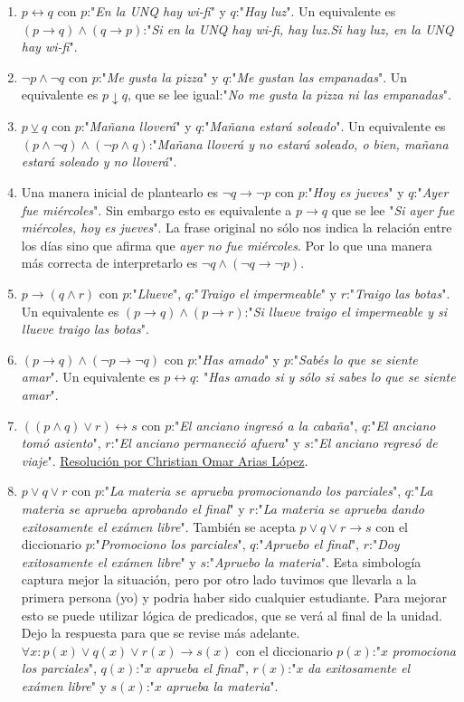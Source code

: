 \documentclass[a4paper]{article}
\newcommand{\then}{\to}
\newcommand{\eq}{\leftrightarrow}
\newcommand{\xor}{\veebar}
\begin{document}
\begin{enumerate}
\begin{enumerate} [label=(\alph*)]
		\item $p\eq q$ con $p$:"\textit{En la UNQ hay wi-fi}" y $q$:"\textit{Hay luz}". Un equivalente es $(p \then q) \land (q \then p)$:"\textit{Si en la UNQ hay wi-fi, hay luz.Si hay luz, en la UNQ hay wi-fi}".
		\item $\neg p  \land  \neg q$ con $p$:"\textit{Me gusta la pizza}" y $q$:"\textit{Me gustan las empanadas}". Un equivalente es $p \downarrow  q$, que se lee igual:"\textit{No me gusta la pizza ni las empanadas}".
		\item $p \xor q$ con $p$:"\textit{Mañana lloverá}" y $q$:"\textit{Mañana estará soleado}". Un equivalente es $(p \land \neg q) \land (\neg p \land q)$:"\textit{Mañana lloverá y no estará soleado, o bien, mañana estará soleado y no lloverá}". 
		\item Una manera inicial de plantearlo es $\neg q\then \neg p$ con $p$:"\textit{Hoy es jueves}" y $q$:"\textit{Ayer fue miércoles}". Sin embargo esto es equivalente a $p \then q$ que se lee "\textit{Si ayer fue miércoles, hoy es jueves}". La frase original no sólo nos indica la relación entre los días sino que afirma que \textit{ayer no fue miércoles}. Por lo que una manera más correcta de interpretarlo es $\neg q \land (\neg q\then \neg p)$.
		\item $p \then  ( q  \land  r )$ con $p$:"\textit{Llueve}", $q$:"\textit{Traigo el impermeable}" y $r$:"\textit{Traigo las botas}". Un equivalente es $(p \then q) \land (p \then r )$:"\textit{Si llueve traigo el impermeable y si llueve traigo las botas}".
		\item $( p \then  q )  \land  ( \neg p \then  \neg q )$ con $p$:"\textit{Has amado}" y $p$:"\textit{Sabés lo que se siente amar}". Un equivalente es $p \eq  q$: "\textit{Has amado si y sólo si sabes lo que se siente amar}".
		\item $((p \land q) \lor r) \eq s$ con $p$:"\textit{El anciano ingresó a la cabaña}", $q$:"\textit{El anciano tomó asiento}", $r$:"\textit{El anciano permaneció afuera}" y $s$:"\textit{El anciano regresó de viaje}". \href{https://youtu.be/TgwraosKUuY?t=331}{Resolución por Christian Omar Arias López}.
		\item $p \lor q \lor r$ con $p$:"\textit{La materia se aprueba promocionando los parciales}", $q$:"\textit{La materia se aprueba aprobando el final}" y $r$:"\textit{La materia se aprueba dando exitosamente el exámen libre}". También se acepta $p \lor q \lor r \then s$ con el diccionario $p$:"\textit{Promociono los parciales}", $q$:"\textit{Apruebo el final}", $r$:"\textit{Doy exitosamente el exámen libre}" y $s$:"\textit{Apruebo la materia}". Esta simbología captura mejor la situación, pero por otro lado tuvimos que llevarla a la primera persona (yo) y podria haber sido cualquier estudiante. Para mejorar esto se puede utilizar lógica de predicados, que se verá al final de la unidad. Dejo la respuesta para que se revise más adelante. $\forall x: p(x) \lor q(x) \lor r(x) \then s(x)$ con el diccionario $p(x)$:"$x$ \textit{promociona los parciales}", $q(x)$:"$x$ \textit{aprueba el final}", $r(x)$:"$x$ \textit{da exitosamente el exámen libre}" y $s(x)$:"$x$ \textit{aprueba la materia}".

\end{enumerate}
\end{enumerate}
\end{document}
